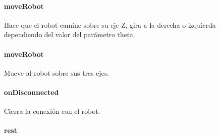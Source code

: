 \paragraph{moveRobot}
\label{\detokenize{dev_docs:id37}}

\begin{fulllineitems}
\label{\detokenize{dev_docs:com.lar.cloudnao.Robot.moveRobot(float)}}
Hace que el robot camine sobre su eje Z, gira a la derecha o izquierda dependiendo del valor del parámetro theta.

\end{fulllineitems}



\paragraph{moveRobot}
\label{\detokenize{dev_docs:id38}}

\begin{fulllineitems}
\label{\detokenize{dev_docs:com.lar.cloudnao.Robot.moveRobot(float, float, float)}}
Mueve al robot sobre sus tres ejes.

\end{fulllineitems}



\paragraph{onDisconnected}
\label{\detokenize{dev_docs:ondisconnected}}

\begin{fulllineitems}
\label{\detokenize{dev_docs:com.lar.cloudnao.Robot.onDisconnected(Activity)}}
Cierra la conexión con el robot.

\end{fulllineitems}



\paragraph{rest}
\label{\detokenize{dev_docs:rest}}

